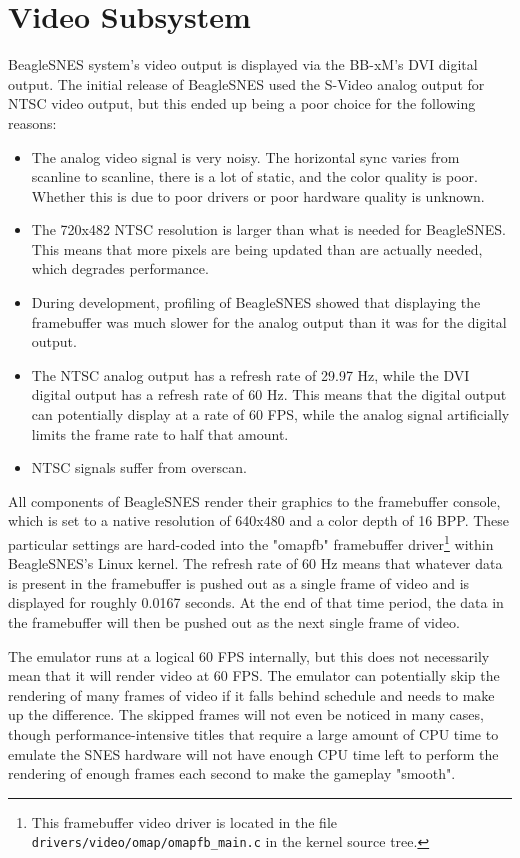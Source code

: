 \section{Video Subsystem}

BeagleSNES system's video output is displayed via the BB-xM's DVI digital output.  The initial release of BeagleSNES used the S-Video analog output for NTSC video output, but this ended up being a poor choice for the following reasons: 

\begin{itemize}
\item The analog video signal is very noisy.  The horizontal sync varies from scanline to scanline, there is a lot of static, and the color quality is poor.  Whether this is due to poor drivers or poor hardware quality is unknown.
 \item The 720x482 NTSC resolution is larger than what is needed for BeagleSNES.  This means that more pixels are being updated than are actually needed, which degrades performance.
\item During development, profiling of BeagleSNES showed that displaying the framebuffer was much slower for the analog output than it was for the digital output.
\item The NTSC analog output has a refresh rate of 29.97 Hz, while the DVI digital output has a refresh rate of 60 Hz.  This means that the digital output can potentially display at a rate of 60 FPS, while the analog signal artificially limits the frame rate to half that amount.
\item NTSC signals suffer from overscan.
\end{itemize}

\noindent{}All components of BeagleSNES render their graphics to the framebuffer console, which is set to a native resolution of 640x480 and a color depth of 16 BPP.  These particular settings are hard-coded into the "omapfb" framebuffer driver\footnote{This framebuffer video driver is located in the file \texttt{drivers/video/omap/omapfb\_main.c} in the kernel source tree.} within BeagleSNES's Linux kernel. The refresh rate of 60 Hz means that whatever data is present in the framebuffer is pushed out as a single frame of video and is displayed for roughly 0.0167 seconds.  At the end of that time period, the data in the framebuffer will then be pushed out as the next single frame of video.

The emulator runs at a logical 60 FPS internally, but this does not necessarily mean that it will render video at 60 FPS.  The emulator can potentially skip the rendering of many frames of video if it falls behind schedule and needs to make up the difference.  The skipped frames will not even be noticed in many cases, though performance-intensive titles that require a large amount of CPU time to emulate the SNES hardware will not have enough CPU time left to perform the rendering of enough frames each second to make the gameplay "smooth".

